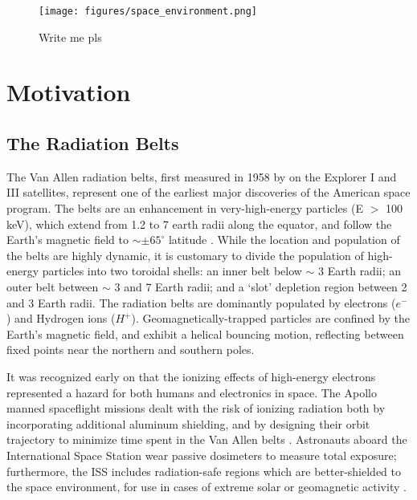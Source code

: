 \begin{figure}[t]
\begin{center}
\texttt{[image: figures/space\_environment.png]}

\caption[Diagram of the various regions of the space environment]{Write me pls}
\label{fig:space_environment}
\end{center}
\end{figure}

\section{Motivation}
\subsection{The Radiation Belts}
The Van Allen radiation belts, first measured in 1958 by \cite{VanAllen1958} on the Explorer I and III satellites, represent one of the earliest major discoveries of the American space program. The belts are an enhancement in very-high-energy particles (E $>$ 100 keV), which extend from 1.2 to 7 earth radii along the equator, and follow the Earth's magnetic field to $\sim \pm65^\circ$ latitude \citep{Walt1994}. While the location and population of the belts are highly dynamic, it is customary to divide the population of high-energy particles into two toroidal shells: an inner belt below $\sim$ 3 Earth radii; an outer belt between $\sim$ 3 and 7 Earth radii; and a `slot' depletion region between 2 and 3 Earth radii. The radiation belts are dominantly populated by electrons ($e^-$) and Hydrogen ions ($H^+$). Geomagnetically-trapped particles are confined by the Earth's magnetic field, and exhibit a helical bouncing motion, reflecting between fixed points near the northern and southern poles.

It was recognized early on that the ionizing effects of high-energy electrons represented a hazard for both humans and electronics in space. The Apollo manned spaceflight missions dealt with the risk of ionizing radiation both by incorporating additional aluminum shielding, and by designing their orbit trajectory to minimize time spent in the Van Allen belts \citep{Apollo1973}. Astronauts aboard the International Space Station wear passive dosimeters to measure total exposure; furthermore, the ISS includes radiation-safe regions which are better-shielded to the space environment, for use in cases of extreme solar or geomagnetic activity \citep{ugh}. 


